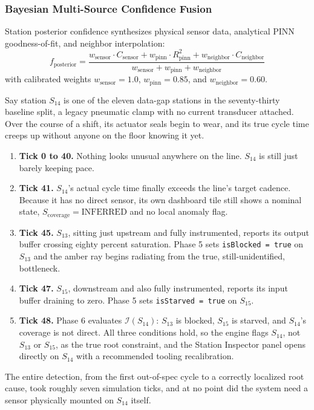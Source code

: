 \documentclass[11pt]{article}
\begin{document}
\subsubsection{Bayesian Multi-Source Confidence Fusion}

Station posterior confidence synthesizes physical sensor data, analytical PINN goodness-of-fit, and neighbor interpolation:
\begin{equation}
f_{\text{posterior}} = \frac{w_{\text{sensor}} \cdot C_{\text{sensor}} + w_{\text{pinn}} \cdot R^2_{\text{pinn}} + w_{\text{neighbor}} \cdot C_{\text{neighbor}}}{w_{\text{sensor}} + w_{\text{pinn}} + w_{\text{neighbor}}}
\end{equation}
with calibrated weights $w_{\text{sensor}} = 1.0$, $w_{\text{pinn}} = 0.85$, and $w_{\text{neighbor}} = 0.60$.

\begin{tcolorbox}[colback=lightbg,colframe=sylasblue,arc=1mm,title={\small Walkthrough, A Bottleneck Forming at an Unmonitored Station},coltitle=white,colbacktitle=sylasblue,fonttitle=\bfseries,breakable]
\small
Say station $S_{14}$ is one of the eleven data-gap stations in the seventy-thirty baseline split, a legacy pneumatic clamp with no current transducer attached. Over the course of a shift, its actuator seals begin to wear, and its true cycle time creeps up without anyone on the floor knowing it yet.

\begin{enumerate}[leftmargin=1cm]
\item \textbf{Tick 0 to 40.} Nothing looks unusual anywhere on the line. $S_{14}$ is still just barely keeping pace.
\item \textbf{Tick 41.} $S_{14}$'s actual cycle time finally exceeds the line's target cadence. Because it has no direct sensor, its own dashboard tile still shows a nominal state, $S_{\text{coverage}} = \text{INFERRED}$ and no local anomaly flag.
\item \textbf{Tick 45.} $S_{13}$, sitting just upstream and fully instrumented, reports its output buffer crossing eighty percent saturation. Phase 5 sets \texttt{isBlocked = true} on $S_{13}$ and the amber ray begins radiating from the true, still-unidentified, bottleneck.
\item \textbf{Tick 47.} $S_{15}$, downstream and also fully instrumented, reports its input buffer draining to zero. Phase 5 sets \texttt{isStarved = true} on $S_{15}$.
\item \textbf{Tick 48.} Phase 6 evaluates $\mathcal{I}(S_{14})$: $S_{13}$ is blocked, $S_{15}$ is starved, and $S_{14}$'s coverage is not direct. All three conditions hold, so the engine flags $S_{14}$, not $S_{13}$ or $S_{15}$, as the true root constraint, and the Station Inspector panel opens directly on $S_{14}$ with a recommended tooling recalibration.
\end{enumerate}
The entire detection, from the first out-of-spec cycle to a correctly localized root cause, took roughly seven simulation ticks, and at no point did the system need a sensor physically mounted on $S_{14}$ itself.
\end{tcolorbox}
\end{document}
